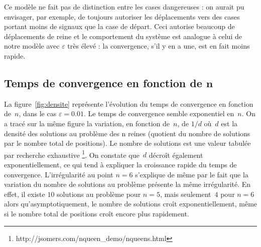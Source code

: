 \documentclass[11pt, openany, a4paper]{article}
\begin{document}

Ce modèle ne fait pas de distinction entre les cases dangereuses : on aurait pu envisager, par exemple, de toujours autoriser les déplacements vers des cases portant moins de signaux que la case de départ. Ceci autorise beaucoup de déplacements de reine et le comportement du système est analogue à celui de notre modèle avec $\varepsilon$ très élevé : la convergence, s'il y en a une, est en fait moins rapide. 

\subsection{Temps de convergence en fonction de $\boldsymbol n$}

  

La figure~\ref{fig:densite} représente l'évolution du temps de convergence en fonction de~$n$, dans le cas $\varepsilon=0.01$. Le temps de convergence semble exponentiel en~$n$. On a tracé sur la même figure la variation, en fonction de~$n$, de $1/d$ où~$d$ est la densité des solutions au problème des n reines (quotient du nombre de solutions par le nombre total de positions). Le nombre de solutions est une valeur tabulée par recherche exhaustive \footnote{http://jsomers.com/nqueen\_demo/nqueens.html}. On constate que~$d$ décroît également exponentiellement, ce qui tend à expliquer la croissance rapide du temps de convergence. L'irrégularité au point $n=6$ s'explique de même par le fait que la variation du nombre de solutions au problème présente la même irrégularité. En effet, il existe $10$ solutions au problème pour $n=5$, mais seulement~$4$ pour $n=6$ alors qu'asymptotiquement, le nombre de solutions croît exponentiellement, même si le nombre total de positions croît encore plus rapidement.
\end{document}
